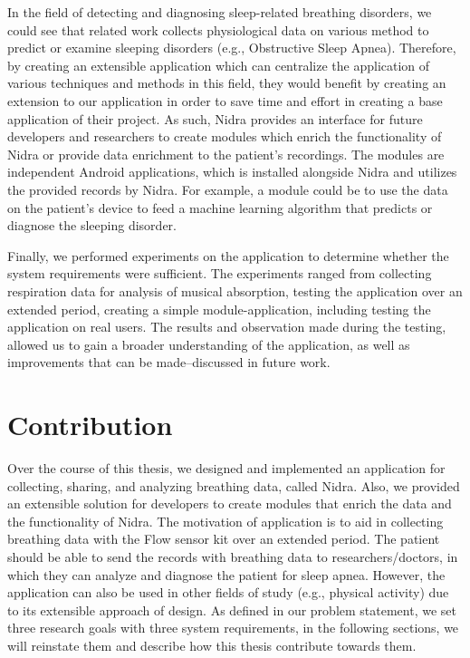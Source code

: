 In the field of detecting and diagnosing sleep-related breathing disorders, we could see that related work collects physiological data on various method to predict or examine sleeping disorders (e.g., Obstructive Sleep Apnea). Therefore, by creating an extensible application which can centralize the application of various techniques and methods in this field, they would benefit by creating an extension to our application in order to save time and effort in creating a base application of their project. As such, Nidra provides an interface for future developers and researchers to create modules which enrich the functionality of Nidra or provide data enrichment to the patient's recordings. The modules are independent Android applications, which is installed alongside Nidra and utilizes the provided records by Nidra.  For example, a module could be to use the data on the patient's device to feed a machine learning algorithm that predicts or diagnose the sleeping disorder.  

Finally, we performed experiments on the application to determine whether the system requirements were sufficient. The experiments ranged from collecting respiration data for analysis of musical absorption, testing the application over an extended period, creating a simple module-application, including testing the application on real users. The results and observation made during the testing, allowed us to gain a broader understanding of the application, as well as improvements that can be made--discussed in future work. 

\section{Contribution}
Over the course of this thesis, we designed and implemented an application for collecting, sharing, and analyzing breathing data, called Nidra. Also, we provided an extensible solution for developers to create modules that enrich the data and the functionality of Nidra. The motivation of application is to aid in collecting breathing data with the Flow sensor kit over an extended period. The patient should be able to send the records with breathing data to researchers/doctors, in which they can analyze and diagnose the patient for sleep apnea. However, the application can also be used in other fields of study (e.g., physical activity)  due to its extensible approach of design. As defined in our problem statement, we set three research goals with three system requirements, in the following sections, we will reinstate them and describe how this thesis contribute towards them.



